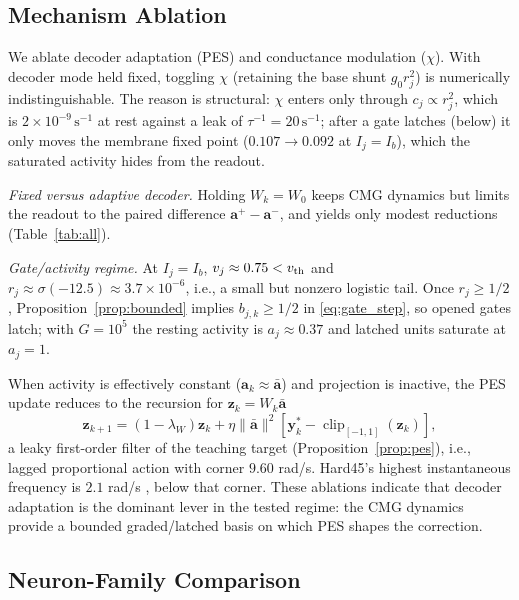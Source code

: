 \documentclass[letterpaper, 10 pt, conference]{ieeeconf}
\newcommand{\clip}{\operatorname{clip}}
\begin{document}
\subsection{Mechanism Ablation}
\label{sec:ablation}

We ablate decoder adaptation (PES) and conductance modulation ($\chi$). With decoder mode held fixed, toggling $\chi$ (retaining the base shunt $g_0r_j^2$) is numerically indistinguishable. The reason is structural: $\chi$ enters only through $c_j\propto r_j^2$, which is $2\times10^{-9}\,\mathrm{s}^{-1}$ at rest against a leak of $\tau^{-1}=20\,\mathrm{s}^{-1}$; after a gate latches (below) it only moves the membrane fixed point ($0.107\to0.092$ at $I_j=I_b$), which the saturated activity hides from the readout.

\emph{Fixed versus adaptive decoder.} Holding $W_k=W_0$ keeps CMG dynamics but limits the readout to the paired difference $\bm a^+-\bm a^-$, and yields only modest reductions (Table~\ref{tab:all}).

\emph{Gate/activity regime.} At $I_j=I_b$, $v_j\approx0.75<v_{\rm th}$ and $r_j\approx\sigma(-12.5)\approx3.7\times10^{-6}$, i.e., a small but nonzero logistic tail. Once $r_j\ge1/2$, Proposition~\ref{prop:bounded} implies $b_{j,k}\ge1/2$ in \eqref{eq:gate_step}, so opened gates latch; with $G=10^5$ the resting activity is $a_j\approx0.37$ and latched units saturate at $a_j=1$.

When activity is effectively constant ($\bm a_k\approx\bar{\bm a}$) and projection is inactive, the PES update reduces to the recursion for $\bm z_k=W_k\bar{\bm a}$
\begin{equation}
 \bm z_{k+1}=(1-\lambda_W)\bm z_k
 +\eta\|\bar{\bm a}\|^2[\bm y_k^*-\clip_{[-1,1]}(\bm z_k)],
 \label{eq:constantbasis}
\end{equation}
a leaky first-order filter of the teaching target (Proposition~\ref{prop:pes}), i.e., lagged proportional action with corner $9.60$ rad/s. Hard45's highest instantaneous frequency is $2.1$ rad/s \cite{sandoval2018instantaneous}, below that corner. These ablations indicate that decoder adaptation is the dominant lever in the tested regime: the CMG dynamics provide a bounded graded/latched basis on which PES shapes the correction.

\subsection{Neuron-Family Comparison}
\label{sec:family}
\end{document}
